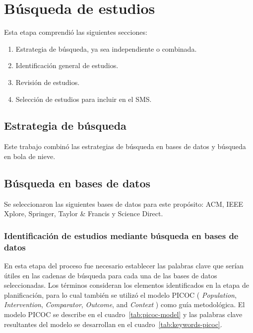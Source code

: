 \section{Búsqueda de estudios}
\noindent

Esta etapa comprendió las siguientes secciones: 
\begin{enumerate}[noitemsep, topsep=0pt, partopsep=0pt]
  \item Estrategia de búsqueda, ya sea independiente o combinada.
  \item Identificación general de estudios.
  \item Revisión de estudios.
  \item Selección de estudios para incluir en el SMS.\@
\end{enumerate}

\subsection{Estrategia de búsqueda}
\noindent
Este trabajo combinó las estrategias de búsqueda en bases de datos y búsqueda en bola de nieve. 

\subsection{Búsqueda en bases de datos}\label{subsec:busquedaBasesDatos}
\noindent
Se seleccionaron las siguientes bases de datos para este propósito: ACM, IEEE Xplore, Springer, Taylor \& Francis y Science Direct.

\subsubsection{Identificación de estudios mediante búsqueda en bases de datos}\label{subsubsec:identificacionEstudios}
\noindent
En esta etapa del proceso fue necesario establecer las palabras clave que serían útiles en las cadenas de búsqueda para cada una de las bases de datos seleccionadas. 
Los términos consideran los elementos identificados en la etapa de planificación, para lo cual también se utilizó el modelo PICOC ( \textit{Population}, \textit{Intervention}, \textit{Comparator}, \textit{Outcome}, and \textit{Context} ) como guía metodológica. El modelo PICOC se describe en el cuadro~\ref{tab:picoc-model} y las palabras clave resultantes del modelo se desarrollan en el cuadro~\ref{tab:keywords-picoc}.

